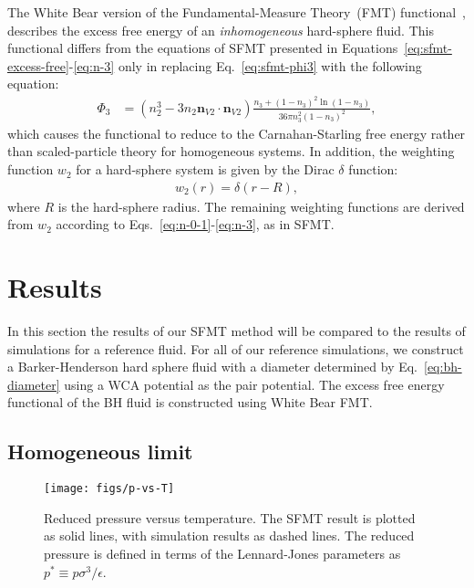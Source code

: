 \documentclass[letterpaper,twocolumn,amsmath,amssymb,prb]{revtex4-1}
\begin{document}
The White Bear version of the Fundamental-Measure Theory~(FMT)
functional~\cite{roth2002whitebear}, describes the excess free energy
of an \emph{inhomogeneous} hard-sphere fluid.  This functional differs
from the equations of SFMT presented in
Equations~\ref{eq:sfmt-excess-free}-\ref{eq:n-3} only in replacing
Eq.~\ref{eq:sfmt-phi3} with the following equation:
\begin{align}
\Phi_3 &= (n_2^3 - 3 n_2 \mathbf{n}_{V2} \cdot \mathbf{n}_{V2}) \frac{
  n_3 + (1-n_3)^2 \ln(1-n_3)
}{
  36\pi n_3^2\left( 1 - n_3 \right)^2
} ,
\end{align}
which causes the functional to reduce to the Carnahan-Starling free
energy rather than scaled-particle theory for homogeneous systems.  In
addition, the weighting function $w_2$ for a hard-sphere system is
given by the Dirac $\delta$ function:
\begin{align}
  w_2(r) = \delta(r - R),
\end{align}
where $R$ is the hard-sphere radius.  The remaining weighting
functions are derived from $w_2$ according to
Eqs.~\ref{eq:n-0-1}-\ref{eq:n-3}, as in SFMT.






\section{Results}
In this section the results of our SFMT method will be compared to the results of simulations for a reference fluid.
For all of our reference simulations, we construct a Barker-Henderson hard
sphere fluid with a diameter determined by Eq.~\ref{eq:bh-diameter}
using a WCA potential as the pair potential. The excess free energy functional of the 
BH fluid is constructed using White Bear FMT. %

\subsection{Homogeneous limit}

\begin{figure}
\begin{center}
\texttt{[image: figs/p-vs-T]}
\end{center}
\caption{Reduced pressure versus temperature.  The SFMT result is
  plotted as solid lines, with simulation results as dashed lines.
  The reduced pressure is defined in terms of the Lennard-Jones
  parameters as $p^{*} \equiv p \sigma^3/\epsilon$.}
\label{fig:p-vs-T}
\end{figure}
\end{document}
